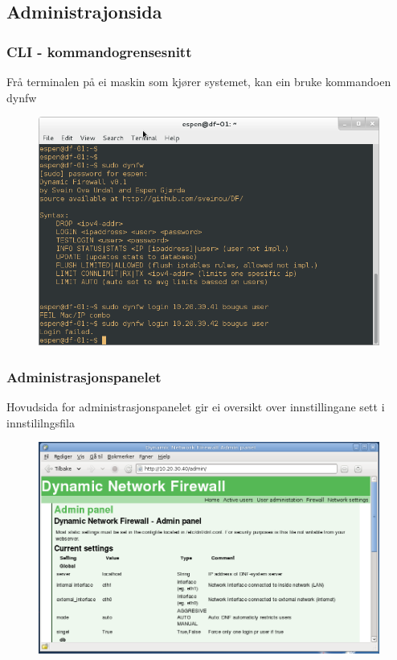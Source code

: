 \documentclass[nynorsk,14pt]{beamer}
\begin{document}
\subsection*{Administrajonsida}
\begin{frame} %
	\frametitle{CLI - kommandogrensesnitt}
	\small{Frå terminalen på ei maskin som kjører systemet, kan ein bruke kommandoen \alert{dynfw}}
	\begin{figure}
	\includegraphics[scale=0.3]{imgs/dynfw_cli.png}
	\end{figure}
\end{frame}
\begin{frame} %
	\frametitle{Administrasjonspanelet}
	\small{Hovudsida for administrasjonspanelet gir ei oversikt over innstillingane sett i innstililngsfila}
	\begin{figure}
		\includegraphics[scale=0.3]{imgs/admin_home.png}
	\end{figure}
\end{frame}
\end{document}
